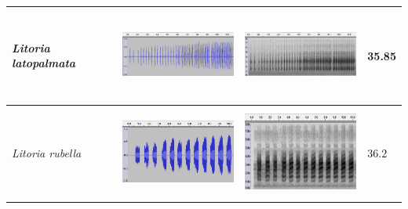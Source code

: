 \begin{table}[htb!]
\begin{tabular}{llll}
\textit{Litoria latopalmata} &      \begin{minipage}{.3\textwidth} \includegraphics[width=45mm, height=30mm]{image/Ch1/latop_wav.png}  \end{minipage}  &    \begin{minipage}{.3\textwidth} \includegraphics[width=45mm, height=30mm]{image/Ch1/latop_spec.png}    \end{minipage}     & 35.85 \\ \hline
\textit{Litoria rubella}     &   \begin{minipage}{.3\textwidth} \includegraphics[width=45mm, height=30mm]{image/Ch1/rubella_wav.png}   \end{minipage}    &       \begin{minipage}{.3\textwidth} \includegraphics[width=45mm, height=30mm]{image/Ch1/rubella_spec.png}   \end{minipage}   & 36.2  \\ \hline\hline
\end{tabular}
\end{table}



